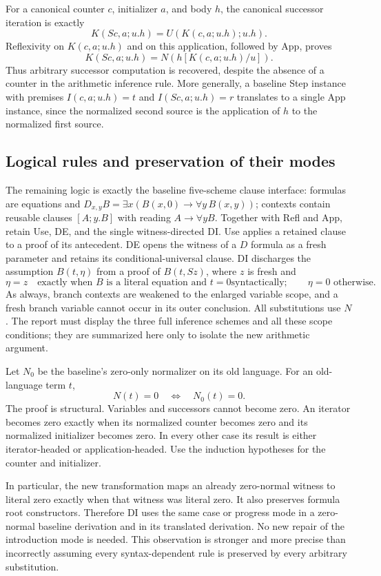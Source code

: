 For a canonical counter $c$, initializer $a$, and body $h$, the
canonical successor iteration is exactly
\[
                K(Sc,a;u.h)=U(K(c,a;u.h);u.h).
\]
Reflexivity on $K(c,a;u.h)$ and on this application, followed by App,
proves
\[
 K(Sc,a;u.h)=N(h[K(c,a;u.h)/u]).
\]
Thus arbitrary successor computation is recovered, despite the absence
of a counter in the arithmetic inference rule.  More generally, a
baseline Step instance with premises
$I(c,a;u.h)=t$ and $I(Sc,a;u.h)=r$ translates to a single App
instance, since the normalized second source is the application of
$h$ to the normalized first source.

\subsection{Logical rules and preservation of their modes}

The remaining logic is exactly the baseline five-scheme clause
interface: formulas are equations and
$D_{x,y}B=\exists x(B(x,0)\to\forall y\,B(x,y))$; contexts contain
reusable clauses $[A;y.B]$ with reading $A\to\forall yB$.  Together
with Refl and App, retain Use, DE, and the single witness-directed DI.
Use applies a retained clause to a proof of its antecedent.  DE opens
the witness of a $D$ formula as a fresh parameter and retains its
conditional-universal clause.  DI discharges the assumption $B(t,\eta)$
from a proof of $B(t,Sz)$, where $z$ is fresh and
\[
 \eta=z\quad\text{exactly when $B$ is a literal equation and $t=0$
 syntactically};\qquad \eta=0\text{ otherwise}.
\]
As always, branch contexts are weakened to the enlarged variable scope,
and a fresh branch variable cannot occur in its outer conclusion.
All substitutions use $N$.  The report must display the three full
inference schemes and all these scope conditions; they are summarized
here only to isolate the new arithmetic argument.

Let $N_0$ be the baseline's zero-only normalizer on its old language.
For an old-language term $t$,
\[
                   N(t)=0\quad\Longleftrightarrow\quad N_0(t)=0.
                   \tag{Zero}
\]
The proof is structural.  Variables and successors cannot become zero.
An iterator becomes zero exactly when its normalized counter becomes
zero and its normalized initializer becomes zero.  In every other
case its result is either iterator-headed or application-headed.
Use the induction hypotheses for the counter and initializer.

In particular, the new transformation maps an already zero-normal
witness to literal zero exactly when that witness was literal zero.
It also preserves formula root constructors.  Therefore DI uses the
same case or progress mode in a zero-normal baseline derivation and
in its translated derivation.  No new repair of the introduction mode
is needed.  This observation is stronger and more precise than
incorrectly assuming every syntax-dependent rule is preserved by every
arbitrary substitution.

